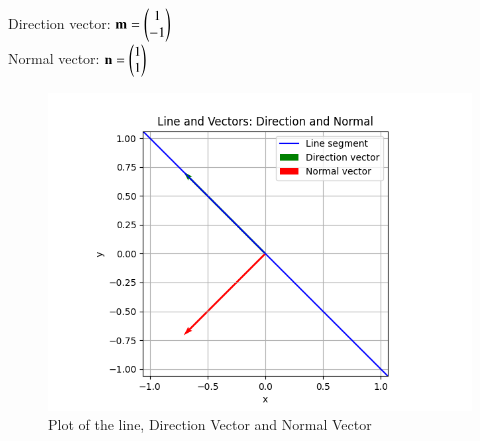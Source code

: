 \documentclass[journal]{IEEEtran}
\begin{document}
Direction vector: $\mathbf{m}=\begin{pmatrix}1\\-1\end{pmatrix}$\\
Normal vector: $\mathbf{n}=\begin{pmatrix}1\\1\end{pmatrix}$
\begin{figure}[h!]
   \centering
   \includegraphics[width = 1\linewidth]{figs/fig.png}
   \caption{Plot of the line, Direction Vector and Normal Vector}
   \label{stemplot}
\end{figure}
\end{document}
